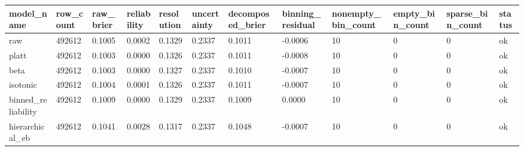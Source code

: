 \begin{tabular}{llllllllllll}
\toprule
model\_name & row\_count & raw\_brier & reliability & resolution & uncertainty & decomposed\_brier & binning\_residual & nonempty\_bin\_count & empty\_bin\_count & sparse\_bin\_count & status \\
\midrule
raw & 492612 & 0.1005 & 0.0002 & 0.1329 & 0.2337 & 0.1011 & -0.0006 & 10 & 0 & 0 & ok \\
platt & 492612 & 0.1003 & 0.0000 & 0.1326 & 0.2337 & 0.1011 & -0.0008 & 10 & 0 & 0 & ok \\
beta & 492612 & 0.1003 & 0.0000 & 0.1327 & 0.2337 & 0.1010 & -0.0007 & 10 & 0 & 0 & ok \\
isotonic & 492612 & 0.1004 & 0.0001 & 0.1326 & 0.2337 & 0.1011 & -0.0007 & 10 & 0 & 0 & ok \\
binned\_reliability & 492612 & 0.1009 & 0.0000 & 0.1329 & 0.2337 & 0.1009 & 0.0000 & 10 & 0 & 0 & ok \\
hierarchical\_eb & 492612 & 0.1041 & 0.0028 & 0.1317 & 0.2337 & 0.1048 & -0.0007 & 10 & 0 & 0 & ok \\
\bottomrule
\end{tabular}
